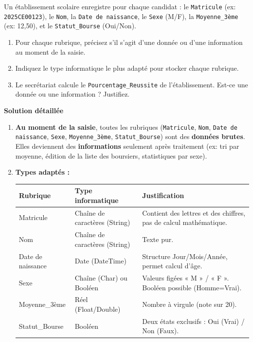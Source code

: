 \documentclass[11pt]{article}
\begin{document}
\begin{exoresolu}
    Un établissement scolaire enregistre pour chaque candidat : le \texttt{Matricule} (ex: \texttt{2025CE00123}), le \texttt{Nom}, la \texttt{Date de naissance}, le \texttt{Sexe} (M/F), la \texttt{Moyenne\_3ème} (ex: 12,50), et le \texttt{Statut\_Bourse} (Oui/Non).
    \begin{enumerate}
        \item Pour chaque rubrique, précisez s'il s'agit d'une donnée ou d'une information au moment de la saisie.
        \item Indiquez le type informatique le plus adapté pour stocker chaque rubrique.
        \item Le secrétariat calcule le \texttt{Pourcentage\_Reussite} de l'établissement. Est-ce une donnée ou une information ? Justifiez.
    \end{enumerate}
    \tcblower
    \textbf{Solution détaillée}
    \begin{enumerate}
        \item \textbf{Au moment de la saisie}, toutes les rubriques (\texttt{Matricule}, \texttt{Nom}, \texttt{Date de naissance}, \texttt{Sexe}, \texttt{Moyenne\_3ème}, \texttt{Statut\_Bourse}) sont des \textbf{données brutes}. Elles deviennent des \textbf{informations} seulement après traitement (ex: tri par moyenne, édition de la liste des boursiers, statistiques par sexe).
        \item \textbf{Types adaptés :}
        \begin{center}
        \begin{tabularx}{\linewidth}{|l|X|l|}
        \hline
        \rowcolor{popblueL}
        \textbf{Rubrique} & \textbf{Type informatique} & \textbf{Justification} \\ \hline
        Matricule & Chaîne de caractères (String) & Contient des lettres et des chiffres, pas de calcul mathématique. \\ \hline
        Nom & Chaîne de caractères (String) & Texte pur. \\ \hline
        Date de naissance & Date (DateTime) & Structure Jour/Mois/Année, permet calcul d'âge. \\ \hline
        Sexe & Chaîne (Char) ou Booléen & Valeurs figées « M » / « F ». Booléen possible (Homme=Vrai). \\ \hline
        Moyenne\_3ème & Réel (Float/Double) & Nombre à virgule (note sur 20). \\ \hline
        Statut\_Bourse & Booléen & Deux états exclusifs : Oui (Vrai) / Non (Faux). \\ \hline

\end{tabularx}
\end{center}
\end{enumerate}
\end{exoresolu}
\end{document}
